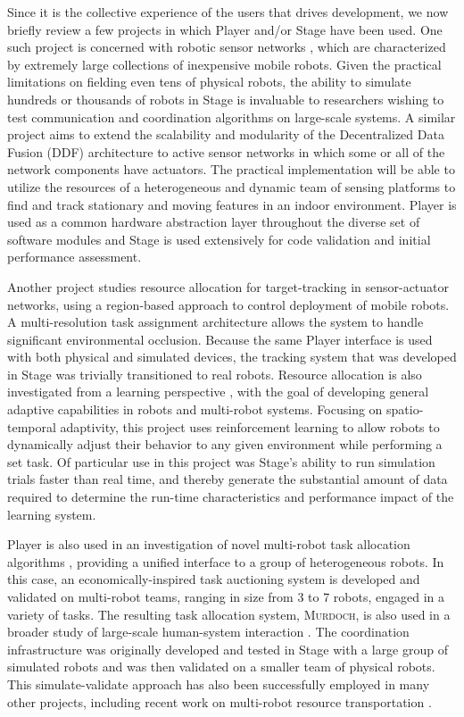 \documentclass[a4paper]{ICAR2003}
\begin{document}
Since it is the collective experience of the users that drives
development, we now briefly review a few projects in which Player and/or
Stage have been used.  One such project is concerned with robotic sensor
networks \cite{SibleyRahimiSukhatme02}, which are characterized by
extremely large collections of inexpensive mobile robots.  Given the
practical limitations on fielding even tens of physical robots, the
ability to simulate hundreds or thousands of robots in Stage is invaluable
to researchers wishing to test communication and coordination algorithms
on large-scale systems.  A similar project \cite{GrocholskyMakarenko03}
aims to extend the scalability and modularity of the Decentralized Data
Fusion (DDF) architecture to active sensor networks in which some or all
of the network components have actuators. The practical implementation
will be able to utilize the resources of a heterogeneous and dynamic team
of sensing platforms to find and track stationary and moving features in
an indoor environment.  Player is used as a common hardware abstraction
layer throughout the diverse set of software modules and Stage is used
extensively for code validation and initial performance assessment.

Another project \cite{JungSukhatme02} studies resource allocation
for target-tracking in sensor-actuator networks, using a region-based
approach to control deployment of mobile robots.  A multi-resolution
task assignment architecture allows the system to handle significant
environmental occlusion.  Because the same Player interface is used
with both physical and simulated devices, the tracking system that
was developed in Stage was trivially transitioned to real robots.
Resource allocation is also investigated from a learning perspective
\cite{Dahl02}, with the goal of developing general adaptive capabilities
in robots and multi-robot systems.  Focusing on spatio-temporal
adaptivity, this project uses reinforcement learning to allow robots
to dynamically adjust their behavior to any given environment while
performing a set task.  Of particular use in this project was Stage's
ability to run simulation trials faster than real time, and thereby
generate the substantial amount of data required to determine the run-time
characteristics and performance impact of the learning system.

Player is also used in an investigation of novel multi-robot task
allocation algorithms \cite{GerkeyMataric02b}, providing a unified
interface to a group of heterogeneous robots.  In this case,
an economically-inspired task auctioning system is developed and
validated on multi-robot teams, ranging in size from 3 to 7 robots,
engaged in a variety of tasks.  The resulting task allocation system,
{\scshape Murdoch}, is also used in a broader study of large-scale
human-system interaction \cite{TewsMataricSukhatme03}.  The coordination
infrastructure was originally developed and tested in Stage with a large
group of simulated robots and was then validated on a smaller team of
physical robots.  This simulate-validate approach has also been
successfully employed in many other projects, including recent work on
multi-robot resource transportation \cite{Vaughan02:LOST-tra}.
\end{document}

